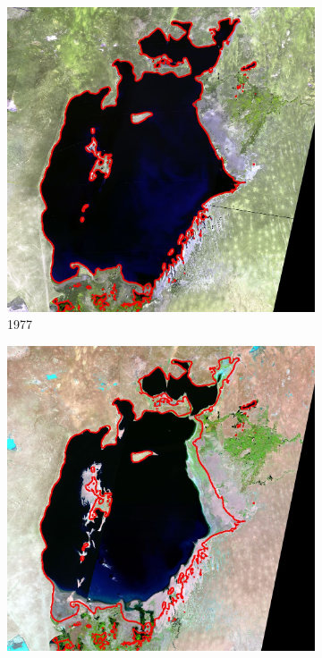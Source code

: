 \documentclass[12pt,a4paper]{article}
\begin{document}
\begin{figure}
    \centering
    \begin{subfigure}[b]{0.19\textwidth}
        \centering
        \includegraphics[width=\textwidth]{../img/1977o.jpg}
        \caption{1977}
    \end{subfigure}
    \begin{subfigure}[b]{0.19\textwidth}
        \centering
        \includegraphics[width=\textwidth]{../img/1987o.jpg}

\end{subfigure}
\end{figure}
\end{document}
